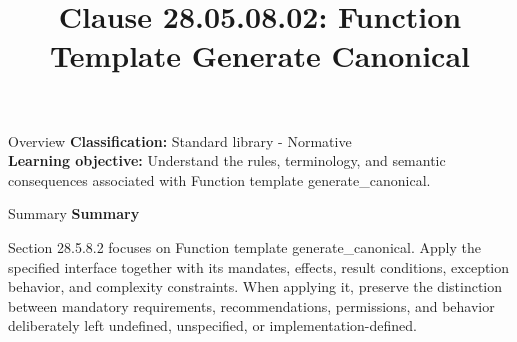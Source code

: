 \documentclass[10pt,letterpaper]{article}
\title{Clause 28.05.08.02: Function Template Generate Canonical}
\author{}
\date{}
\begin{document}
\maketitle
\begin{CornellOverviewBox}{Overview}
\textbf{Classification:} Standard library - Normative\\[2pt]
\textbf{Learning objective:} Understand the rules, terminology, and semantic consequences associated with Function template generate\_canonical.
\end{CornellOverviewBox}\begin{CornellSummaryBox}{Summary}
{\sffamily\bfseries\color{Accent} Summary}\par\vspace{3pt}Section 28.5.8.2 focuses on Function template generate\_canonical. Apply the specified interface together with its mandates, effects, result conditions, exception behavior, and complexity constraints. When applying it, preserve the distinction between mandatory requirements, recommendations, permissions, and behavior deliberately left undefined, unspecified, or implementation-defined.
\end{CornellSummaryBox}
\end{document}

